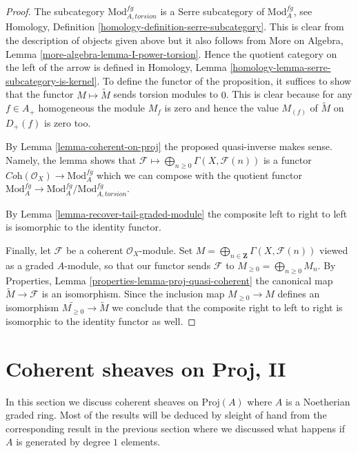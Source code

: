\begin{proof}
The subcategory $\text{Mod}^{fg}_{A, torsion}$ is a Serre subcategory
of $\text{Mod}^{fg}_A$, see
Homology, Definition \ref{homology-definition-serre-subcategory}.
This is clear from the description of objects given above but it also follows
from More on Algebra, Lemma \ref{more-algebra-lemma-I-power-torsion}.
Hence the quotient category on the left of the arrow is defined
in Homology, Lemma \ref{homology-lemma-serre-subcategory-is-kernel}.
To define the functor of the proposition, it suffices to show that
the functor $M \mapsto \widetilde M$ sends torsion modules to $0$.
This is clear because for any $f \in A_+$ homogeneous the
module $M_f$ is zero and hence the value $M_{(f)}$ of $\widetilde M$
on $D_+(f)$ is zero too.

\medskip\noindent
By Lemma \ref{lemma-coherent-on-proj} the proposed quasi-inverse
makes sense. Namely, the lemma shows that
$\mathcal{F} \longmapsto \bigoplus_{n \geq 0} \Gamma(X, \mathcal{F}(n))$
is a functor $\textit{Coh}(\mathcal{O}_X) \to \text{Mod}^{fg}_A$
which we can compose with the quotient functor
$\text{Mod}^{fg}_A \to \text{Mod}^{fg}_A/\text{Mod}^{fg}_{A, torsion}$.

\medskip\noindent
By Lemma \ref{lemma-recover-tail-graded-module}
the composite left to right to left is isomorphic to the identity functor.

\medskip\noindent
Finally, let $\mathcal{F}$ be a coherent $\mathcal{O}_X$-module.
Set $M = \bigoplus_{n \in \mathbf{Z}} \Gamma(X, \mathcal{F}(n))$
viewed as a graded $A$-module, so that our functor sends $\mathcal{F}$ to
$M_{\geq 0} = \bigoplus_{n \geq 0} M_n$.
By Properties, Lemma \ref{properties-lemma-proj-quasi-coherent}
the canonical map $\widetilde M \to \mathcal{F}$
is an isomorphism. Since the inclusion map
$M_{\geq 0} \to M$ defines an isomorphism
$\widetilde{M_{\geq 0}} \to \widetilde M$ we conclude that
the composite right to left to right is isomorphic to the identity
functor as well.
\end{proof}





\section{Coherent sheaves on Proj, II}
\label{section-coherent-proj-general}

\noindent
In this section we discuss coherent sheaves on $\text{Proj}(A)$
where $A$ is a Noetherian graded ring. Most of the results will
be deduced by sleight of hand from the corresponding result in the
previous section where we discussed what happens if $A$ is generated
by degree $1$ elements.

